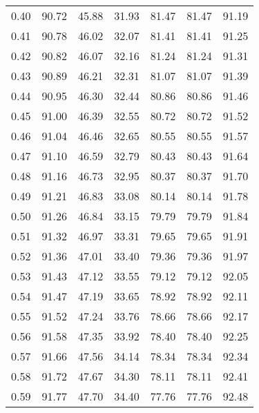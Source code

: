 \begin{tabular}{|c|c|c|c|c|c|c|}
      0.40 &     90.72 &     45.88 &      31.93 &   81.47 &      81.47 &         91.19 \\
      0.41 &     90.78 &     46.02 &      32.07 &   81.41 &      81.41 &         91.25 \\
      0.42 &     90.82 &     46.07 &      32.16 &   81.24 &      81.24 &         91.31 \\
      0.43 &     90.89 &     46.21 &      32.31 &   81.07 &      81.07 &         91.39 \\
      0.44 &     90.95 &     46.30 &      32.44 &   80.86 &      80.86 &         91.46 \\
      0.45 &     91.00 &     46.39 &      32.55 &   80.72 &      80.72 &         91.52 \\
      0.46 &     91.04 &     46.46 &      32.65 &   80.55 &      80.55 &         91.57 \\
      0.47 &     91.10 &     46.59 &      32.79 &   80.43 &      80.43 &         91.64 \\
      0.48 &     91.16 &     46.73 &      32.95 &   80.37 &      80.37 &         91.70 \\
      0.49 &     91.21 &     46.83 &      33.08 &   80.14 &      80.14 &         91.78 \\
      0.50 &     91.26 &     46.84 &      33.15 &   79.79 &      79.79 &         91.84 \\
      0.51 &     91.32 &     46.97 &      33.31 &   79.65 &      79.65 &         91.91 \\
      0.52 &     91.36 &     47.01 &      33.40 &   79.36 &      79.36 &         91.97 \\
      0.53 &     91.43 &     47.12 &      33.55 &   79.12 &      79.12 &         92.05 \\
      0.54 &     91.47 &     47.19 &      33.65 &   78.92 &      78.92 &         92.11 \\
      0.55 &     91.52 &     47.24 &      33.76 &   78.66 &      78.66 &         92.17 \\
      0.56 &     91.58 &     47.35 &      33.92 &   78.40 &      78.40 &         92.25 \\
      0.57 &     91.66 &     47.56 &      34.14 &   78.34 &      78.34 &         92.34 \\
      0.58 &     91.72 &     47.67 &      34.30 &   78.11 &      78.11 &         92.41 \\
      0.59 &     91.77 &     47.70 &      34.40 &   77.76 &      77.76 &         92.48 \\

\end{tabular}
